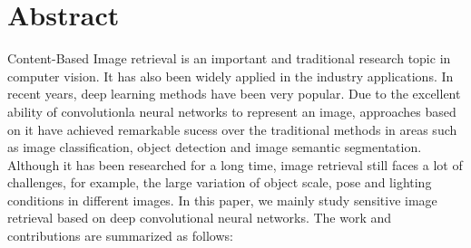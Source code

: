 
\chapter*{Abstract}
Content-Based Image retrieval is an important and traditional research topic in computer vision. It has also been widely applied in the industry applications. In recent years, deep learning methods have been very popular. Due to the excellent ability of convolutionla neural networks to represent an image, approaches based on it have achieved remarkable sucess over the traditional methods in areas such as image classification, object detection and image semantic segmentation. Although it has been researched for a long time, image retrieval still faces a lot of challenges, for example, the large variation of object scale, pose and lighting conditions in different images. In this paper, we mainly study sensitive image retrieval based on deep convolutional neural networks. The work and contributions are summarized as follows:

